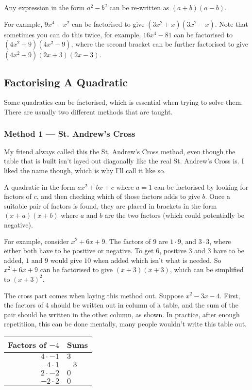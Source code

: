 Any expression in the form $a^2 - b^2$ can be re-written as $(a+b)(a-b)$.

For example, $9x^4-x^2$ can be factorised to give $(3x^2+x)(3x^2-x)$. Note that sometimes you can do this twice, for example, $16x^4-81$ can be factorised to $(4x^2+9)(4x^2-9)$, where the second bracket can be further factorised to give $(4x^2+9)(2x+3)(2x-3)$.

\subsection{Factorising A Quadratic}
Some quadratics can be factorised, which is essential when trying to solve them. There are usually two different methods that are taught.

\subsubsection{Method 1 — St. Andrew's Cross}
My friend always called this the St. Andrew's Cross method, even though the table that is built isn't layed out diagonally like the real St. Andrew's Cross is. I liked the name though, which is why I'll call it like so.

A quadratic in the form $ax^2+bx+c$ where $a=1$ can be factorised by looking for factors of $c$, and then checking which of those factors adds to give $b$. Once a suitable pair of factors is found, they are placed in brackets in the form $(x+a)(x+b)$ where $a$ and $b$ are the two factors (which could potentially be negative).

For example, consider $x^2+6x+9$. The factors of $9$ are $1 \cdot 9$, and $3 \cdot 3$, where either both have to be positive or negative. To get $6$, positive $3$ and $3$ have to be added, $1$ and $9$ would give $10$ when added which isn't what is needed. So $x^2+6x+9$ can be factorised to give $(x+3)(x+3)$, which can be simplified to $(x+3)^2$.

The cross part comes when laying this method out. Suppose $x^2-3x-4$. First, the factors of $4$ should be written out in column of a table, and the sum of the pair should be written in the other column, as shown. In practice, after enough repetitiion, this can be done mentally, many people wouldn't write this table out.

\medskip

\begin{tabular}{r | l}
	Factors of $-4$ & Sums\\
	\hline
	$4 \cdot -1$ & $3$\\
	$-4 \cdot 1$ & $-3$\\
	$2 \cdot -2$ & $0$\\
	$-2 \cdot 2$ & $0$\\
\end{tabular}

